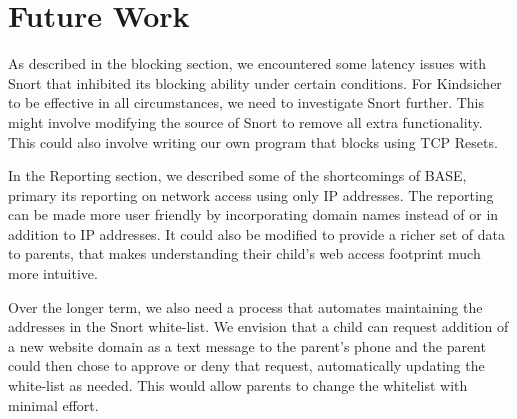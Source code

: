 
\section{Future Work}

As described in the blocking section, we encountered some latency issues with
Snort that inhibited its blocking ability under certain conditions. For
Kindsicher to be effective in all circumstances, we need to investigate Snort
further. This might involve modifying the source of Snort to remove all extra
functionality. This could also involve writing our own program that blocks
using TCP Resets.

In the Reporting section, we described some of the shortcomings of BASE,
primary its reporting on network access using only IP addresses.  The
reporting can be made more user friendly by incorporating domain names instead
of or in addition to IP addresses. It could also be modified to provide a
richer set of data to parents, that makes understanding their child's web
access footprint much more intuitive.

Over the longer term, we also need a process that automates maintaining the
addresses in the Snort white-list. We envision that a child can request
addition of a new website domain as a text message to the parent's phone and
the parent could then chose to approve or deny that request, automatically
updating the white-list as needed. This would allow parents to change the
whitelist with minimal effort.
